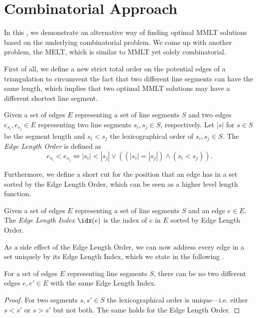 \section{Combinatorial Approach}
\label{sec:combinatorial_approach}
In this , we demonstrate an
alternative way of finding optimal \gls{MMLT} solutions based on the
underlying combinatorial problem. We come up with another problem, the
\gls{MELT}, which is similar to \gls{MMLT} yet solely combinatorial.

First of all, we define a new strict total order on the potential
edges of a triangulation to circumvent the fact that two different
line segments can have the same length, which implies that two optimal
\gls{MMLT} solutions may have a different shortest line segment.

\begin{definition}
  \label{def:edge_length_order}
  Given a set of edges \(E\) representing a set of line segments
  \(S\) and two edges \(e_{s_i}, e_{s_j} \in E\) representing two
  line segments \(s_i,s_j \in S\), respectively. Let \(|s|\) for
  \(s \in S\) be the segment length and \( s_i < s_j \) the
  lexicographical order of \(s_i, s_j \in S\). The \emph{Edge Length
  Order} is defined as  
  \[
    e_{s_i} < e_{s_j}
    \iff |s_i| < |s_j|
    \lor ((|s_i| = |s_j|) \land (s_i < s_j)).
  \]
\end{definition}

Furthermore, we define a short cut for the position that an edge has
in a set sorted by the Edge Length Order, which can be seen as a
higher level length function.

\begin{definition}
  \label{def:edge_length_index}
  Given a set of edges \(E\) representing a set of line segments
  \(S\) and an edge \(e \in E\). The \emph{Edge Length Index}
  \(\idx(e)\) is the index of \(e\) in \(E\) sorted by 
  Edge Length Order.
\end{definition}

As a side effect of the Edge Length Order, we can now address every
edge in a set uniquely by its Edge Length Index, which we state in the
following .

\begin{theorem}
  \label{thm:edge_length_index_uniqueness}
  For a set of edges \(E\) representing line segments \(S\),
  there can be no two different edges \(e, e' \in E\)
  with the same Edge Length Index.
  \begin{proof}
  For two segments \(s, s' \in S\) the lexicographical order is
  unique---i.e. either \(s < s'\) or \(s > s'\) but not both. The
  same holds for the Edge Length Order.
  \end{proof}
\end{theorem}

